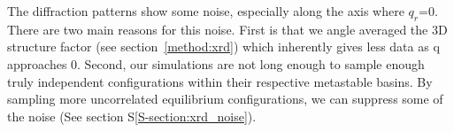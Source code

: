 \documentclass[journal=jpcbfk,manusciprt=article]{achemso}
\begin{document}
  The diffraction patterns show some noise, especially along the axis where $q_r$=0. There are
  two main reasons for this noise. First is that we angle averaged the 3D structure factor 
  (see section~\ref{method:xrd}) which inherently gives less data as q approaches 0. Second, 
  our simulations are not long enough to sample enough truly independent configurations within
  their respective metastable basins. By sampling more uncorrelated equilibrium configurations,
  we can suppress some of the noise (See section S\ref{S-section:xrd_noise}).
  
\end{document}
